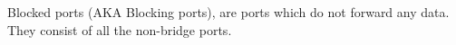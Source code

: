 Blocked ports (AKA Blocking ports), are ports which do not forward any data. They consist of all the non-bridge ports.